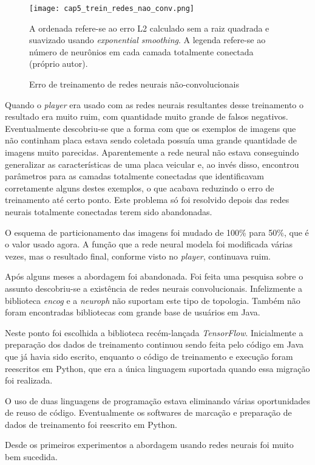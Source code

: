 \begin{figure}[!htb]
	\centering
	\texttt{[image: cap5\_trein\_redes\_nao\_conv.png]}
	\caption{Erro de treinamento de redes neurais não-convolucionais}
	\label{fig:cap5_trein_redes_nao_conv}
	A ordenada refere-se ao erro L2 calculado sem a raiz quadrada e suavizado
	usando \emph{exponential smoothing}. A legenda refere-se ao número de
	neurônios em cada camada totalmente conectada (próprio autor).
\end{figure}

Quando o \emph{player} era usado com as redes neurais resultantes
desse treinamento o
resultado era muito ruim, com quantidade muito grande de falsos negativos.
Eventualmente descobriu-se que a forma com que os exemplos de imagens que não
continham placa estava sendo coletada possuía uma grande quantidade de imagens
muito parecidas. Aparentemente a rede neural não estava conseguindo generalizar
as características de uma placa veicular e, ao invés disso, encontrou
parâmetros para as camadas totalmente conectadas que identificavam corretamente
alguns destes exemplos, o que acabava reduzindo o erro de treinamento até certo
ponto. Este problema só foi resolvido depois das redes neurais
totalmente conectadas terem sido abandonadas.

O esquema de particionamento das imagens foi mudado de 100\% para 50\%, que é o
valor usado agora. A função que a rede neural modela foi modificada
várias vezes, mas o resultado final, conforme visto no \emph{player},
continuava ruim.

Após alguns meses a abordagem foi abandonada. Foi feita uma pesquisa sobre o
assunto descobriu-se a existência de redes neurais convolucionais. Infelizmente
a biblioteca \emph{encog} e a \emph{neuroph} não suportam este tipo de
topologia. Também não foram encontradas bibliotecas com grande base de
usuários em Java.

Neste ponto foi escolhida a biblioteca recém-lançada \emph{TensorFlow}.
Inicialmente a
preparação dos dados de treinamento continuou sendo feita pelo código em Java
que já havia sido escrito, enquanto o código de treinamento e execução foram
reescritos em Python, que era a única linguagem suportada quando essa
migração foi realizada.

O uso de duas linguagens de programação estava eliminando várias oportunidades
de reuso de código. Eventualmente os softwares de marcação e preparação de
dados de treinamento foi reescrito em Python.

Desde os primeiros experimentos a abordagem usando redes neurais foi muito bem
sucedida.

